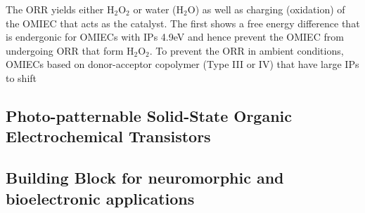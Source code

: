 The ORR yields either H$_{2}$O$_{2}$ or water (H$_{2}$O) as well as charging (oxidation) of the OMIEC that acts as the catalyst. The first shows a free energy difference that is endergonic for OMIECs with IPs \> 4.9eV and hence prevent the OMIEC from undergoing ORR that form H$_{2}$O$_{2}$. To prevent the ORR in ambient conditions, OMIECs based on donor-acceptor copolymer (Type III or IV) that have large IPs to shift
\cite{giovannittiEnergeticControlRedoxActive2020}

\subsection{Photo-patternable Solid-State Organic Electrochemical Transistors}


\subsection{Building Block for neuromorphic and bioelectronic applications}




